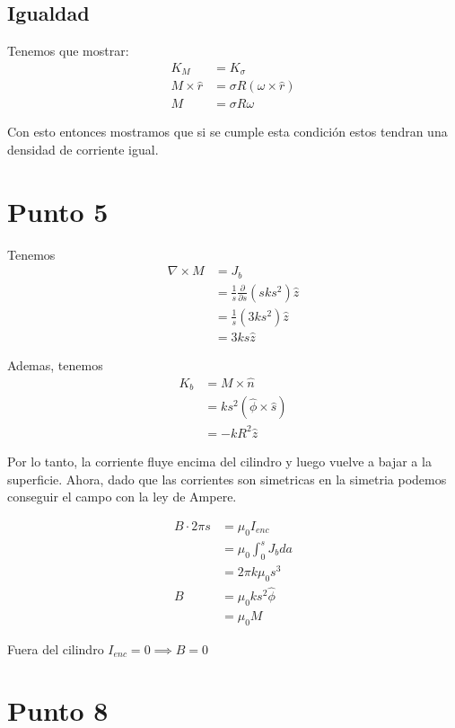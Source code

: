 \documentclass{report}
\begin{document}
\section{Igualdad}

Tenemos que mostrar:
\begin{align*}
  K_M &= K_\sigma\\
  M \times \hat{r} &= \sigma R (\omega \times \hat{r})\\
  M &= \sigma R \omega
\end{align*}

Con esto entonces mostramos que si se cumple esta condición estos tendran una densidad de corriente igual.

\chapter{Punto 5}

Tenemos
\begin{align*}
  \nabla \times M &= J_b\\
  &= \frac{1}{s}\frac{\partial}{\partial s}(s k s^2)\hat{z}\\
  &= \frac{1}{s}(3ks^2)\hat{z}\\
  &= 3ks\hat{z}
\end{align*}

Ademas, tenemos
\begin{align*}
  K_b &= M \times \hat{n}\\
  &= k s^2 (\hat{\phi} \times \hat{s})\\
  &= -kR^2\hat{z}
\end{align*}

Por lo tanto, la corriente fluye encima del cilindro y luego vuelve a bajar a la superficie. Ahora, dado que las corrientes son simetricas en la simetria  podemos conseguir el campo con la ley de Ampere.

\begin{align*}
  B \cdot 2\pi s &= \mu_0 I_{enc}\\
  &= \mu_0 \int_0^s J_b da\\
  &= 2\pi k \mu_0 s^3\\
  B &= \mu_0 k s^2 \hat{\phi}\\
  &= \mu_0 M
\end{align*}

Fuera del cilindro $I_{enc} = 0 \implies B = 0$

\chapter{Punto 8}
\end{document}
